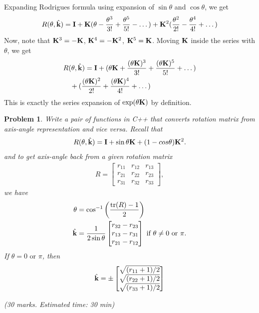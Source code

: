 \documentclass[twocolumn]{article}
\newtheorem{prob}{Problem}
\begin{document}
Expanding Rodrigues formula using expansion of $\sin\theta$ and $\cos\theta$, we
get
\begin{align}
  R(\theta, \hat{\mathbf{k}}) = \mathbf{I} + \mathbf{K}(\theta - \frac{\theta^3}{3!} + \frac{\theta^5}{5!}  - \dots) + \mathbf{K}^2(\frac{\theta^2 }{2!} - \frac{\theta^4}{4!} + \dots )
\end{align}
Now, note that $\mathbf{K}^3 = -\mathbf{K}$, $\mathbf{K}^4 = -\mathbf{K}^2$, $\mathbf{K}^5 = \mathbf{K}$. Moving
$\mathbf{K}$ inside the series with $\theta$, we get
\begin{align}
  &R(\theta, \hat{\mathbf{k}}) = \mathbf{I} + (\theta\mathbf{K} + \frac{(\theta\mathbf{K})^3}{3!} + \frac{(\theta\mathbf{K})^5}{5!}  + \dots)
    \notag\\
  &\quad
  + (\frac{(\theta\mathbf{K})^2 }{2!} + \frac{(\theta\mathbf{K})^4}{4!} + \dots )
  \end{align}
  This is exactly the series expansion of $\exp(\theta\mathbf{K})$ by definition.
\fi

\begin{prob}
  Write a pair of functions in C++ that converts rotation matrix from axis-angle
  representation and vice versa. Recall that
  \begin{align}
    R(\theta, \hat{\mathbf{k}}) = \mathbf{I} + \sin \theta \mathbf{K} + (1-cos \theta) \mathbf{K}^2.
  \end{align}
  and to get axis-angle back from a given rotation matrix
  \begin{align}
    R = \begin{bmatrix}
      r_{11} & r_{12} & r_{13} \\
      r_{21} & r_{22} & r_{23} \\
      r_{31} & r_{32} & r_{33}
      \end{bmatrix},
  \end{align}
  we have
  \begin{align}
    \theta &= \cos^{-1} \left(\frac{\text{tr}(R) - 1}{2}\right)
    \\
    \hat{\mathbf{k}} &= \frac{1}{2\sin\theta}\begin{bmatrix}
      r_{32} - r_{23} \\
      r_{13} - r_{31} \\
      r_{21} - r_{12}
      \end{bmatrix} \text{ if  } \theta \ne 0 \text{ or } \pi.
  \end{align}
 If $\theta = 0 \text{ or } \pi$, then
 \begin{align}
   \hat{\mathbf{k}} = \pm\begin{bmatrix}
    \sqrt{(r_{11} + 1)/2}\\
    \sqrt{(r_{22} + 1)/2}\\
    \sqrt{(r_{33} + 1)/2}
   \end{bmatrix}
   \end{align}
  
  (30 marks. Estimated time: 30 min)
  \label{prob:euler-to-rotmat}
\end{prob}
\end{document}
